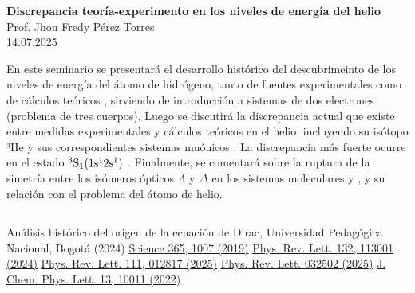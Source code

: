 \documentclass[a4paper,12pt]{article}
\begin{document}
\begin{center}
	{\bf Discrepancia teoría-experimento en los niveles de energía del helio} \\
	Prof. Jhon Fredy Pérez Torres \\
	14.07.2025
\end{center}

	En este seminario se presentará el desarrollo histórico del 
	descubrimeinto de los niveles de energ\'ia del átomo de hidrógeno,
	tanto de fuentes experimentales como de cálculos teóricos
	\cite{Duarte2024,Bezginov2019,Scheidegger2024},
	sirviendo de introducción a sistemas de dos electrones (problema de tres cuerpos).
	Luego se discutirá la discrepancia actual que existe entre medidas
	experimentales y cálculos teóricos en el helio, incluyendo su isótopo
	³He y sus correspondientes sistemas muónicos \cite{Clausen2025,Muli2025}.
	La discrepancia m\'as fuerte ocurre en el estado $\rm {^3S_1}(1s^12s^1)$ \cite{Clausen2025}.
	Finalmente, se comentar\'a sobre la ruptura de la simetr\'ia entre los is\'omeros
	\'opticos $\Lambda$ y $\Delta$ en los sistemas moleculares 
	y  \cite{RuAcac3}, y su relaci\'on con el problema del \'atomo de helio.

\vspace{1cm}\hrule
\begin{thebibliography}{9}
	\footnotesize
	 Análisis histórico del origen de la ecuación de Dirac,
		Universidad Pedagógica Nacional, Bogotá (2024)
	 \href{https://doi.org/10.1126/science.aau7807}{Science 365, 1007 (2019)}
	 \href{https://doi.org/10.1103/PhysRevLett.132.113001}{Phys. Rev. Lett. 132, 113001 (2024)}
	 \href{https://doi.org/10.1103/PhysRevA.111.012817}{Phys. Rev. Lett. 111, 012817 (2025)}
	 \href{https://doi.org/10.1103/PhysRevLett.110.032502}{Phys. Rev. Lett. 032502 (2025)}
	 \href{https://doi.org/10.1021/acs.jpclett.2c02434}{J. Chem. Phys. Lett. 13, 10011 (2022)}
\end{thebibliography}
\end{document}
